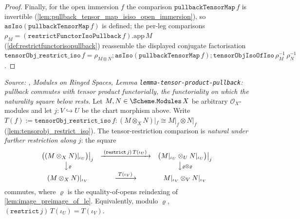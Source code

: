 \begin{proof}
  Finally, for the open immersion \(f\) the comparison \(\mathtt{pullbackTensorMap}\,f\) is
  invertible (\cref{lem:pullback_tensor_map_isiso_open_immersion}), so
  \(\mathtt{asIso}(\mathtt{pullbackTensorMap}\,f)\) is defined; the per-leg comparisons
  \(\rho_M = (\mathtt{restrictFunctorIsoPullback}\,f).\mathrm{app}\,M\)
  (\cref{def:restrictfunctorisopullback}) reassemble the displayed conjugate factorisation
  \(\mathtt{tensorObj\_restrict\_iso}\,f = \rho_{M \otimes N} \mathbin{;}
  \mathtt{asIso}(\mathtt{pullbackTensorMap}\,f) \mathbin{;}
  \mathtt{tensorObjIsoOfIso}\,\rho_M^{-1}\,\rho_N^{-1}\).
\end{proof}

\begin{lemma}\leanok
  \label{lem:tensorobj_restrict_iso_restrict_compat}
  \textit{Source: \cite{stacks-project}, Modules on Ringed Spaces, Lemma
  \texttt{lemma-tensor-product-pullback}: pullback commutes with tensor product
  \emph{functorially}, the functoriality on which the naturality square below rests.}
  Let \(M, N \in \Scheme.\mathtt{Modules}\,X\) be arbitrary \(\mathcal{O}_X\)-modules and let
  \(j : V \hookrightarrow U\) be the chart morphism above. Write
  \(T(f) := \mathtt{tensorObj\_restrict\_iso}\,f : (M \otimes_X N)|_f \cong M|_f \otimes N|_f\)
  (\cref{lem:tensorobj_restrict_iso}). The tensor-restriction comparison is \emph{natural under
  further restriction along \(j\)}: the square
  \[
    \begin{array}{ccc}
      \bigl((M \otimes_X N)|_{\iota_U}\bigr)\big|_j
        & \xrightarrow{\;(\mathtt{restrict}\,j)\,T(\iota_U)\;}
        & \bigl(M|_{\iota_U} \otimes_U N|_{\iota_U}\bigr)\big|_j \\[2pt]
      \big\downarrow{\scriptstyle \varrho}
        & & \big\downarrow{\scriptstyle \varrho \otimes \varrho} \\[2pt]
      (M \otimes_X N)|_{\iota_V}
        & \xrightarrow{\;T(\iota_V)\;}
        & M|_{\iota_V} \otimes_V N|_{\iota_V}
    \end{array}
  \]
  commutes, where \(\varrho\) is the equality-of-opens reindexing of
  \cref{lem:image_preimage_of_le}. Equivalently, modulo \(\varrho\),
  \((\mathtt{restrict}\,j)\,T(\iota_U) = T(\iota_V)\).
\end{lemma}
